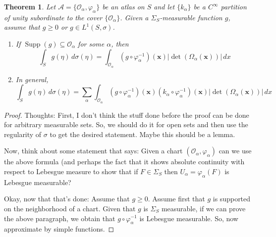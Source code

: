 \documentclass[11pt]{article}
\theoremstyle{theorem}
\newtheorem{theorem}{Theorem}[section]
\newcommand\supp{\operatorname{Supp}}
\renewcommand\det{\operatorname{det}}
\begin{document}
\begin{theorem}
Let $\mathcal{A}=\{\mathcal{O}_\alpha,\varphi_\alpha\}$ be an atlas on $S$ and let $\{k_\alpha\}$ be a $C^\infty$ partition of unity subordinate to the cover $\{\mathcal{O}_\alpha\}$. Given a $\Sigma_S$-measurable function $g$, assume that $g\geq 0$ or $g\in L^1(S,\sigma)$.
\begin{enumerate}
\item If $\supp(g)\subseteq \mathcal{O}_\alpha$ for some $\alpha$, then
\begin{equation*}
\int_S g(\eta)\,d\sigma(\eta)=\int_{\mathcal{O}_\alpha}(g\circ\varphi_{\alpha}^{-1})(\mathbf{x})|\det(\Omega_\alpha(\mathbf{x}))|\,dx
\end{equation*}
\item In general,
\begin{equation*}
\int_S g(\eta)\,d\sigma(\eta)=\sum_{\alpha}\int_{\mathcal{O}_\alpha}(g\circ \varphi_\alpha^{-1})(\mathbf{x})(k_\alpha\circ\varphi_{\alpha}^{-1})(\mathbf{x})|\det(\Omega_\alpha(\mathbf{x}))|\,dx
\end{equation*}
\end{enumerate}
\end{theorem}
\begin{proof}
Thoughts: First, I don't think the stuff done before the proof can be done for arbitrary measurable sets. So, we should do it for open sets and then use the regularity of $\sigma$ to get the desired statement. Maybe this should be a lemma. 

Now, think about some statement that says: Given a chart $(\mathcal{O}_\alpha,\varphi_\alpha)$ can we use the above formula (and perhaps the fact that it shows absolute continuity with respect to Lebesgue measure to show that if $F\in \Sigma_S$ then $U_\alpha=\varphi_{\alpha}(F)$ is Lebesgue measurable?

Okay, now that that's done: Assume that $g\geq 0$. Assume first that $g$ is supported on the neighborhood of a chart. Given that $g$ is $\Sigma_S$ measurable, if we can prove the above paragraph, we obtain that $g\circ\varphi^{-1}_\alpha$ is Lebesgue measurable. So, now approximate by simple functions.
\end{proof}
\end{document}
